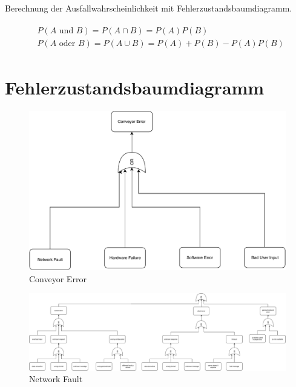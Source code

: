 \documentclass{beamer}
\begin{document}
\begin{frame}
	Berechnung der Ausfallwahrscheinlichkeit mit Fehlerzustandsbaumdiagramm. 
	
	\begin{align}\label{key}
	\begin{split}
	&P(A \text{ und } B) = P(A\cap B) = P(A)P(B)\\
	&P(A \text{ oder } B) = P(A\cup B) = P(A)+P(B)-P(A)P(B)
	\end{split}
	\end{align}
\end{frame}

\section{Fehlerzustandsbaumdiagramm}
\frame{\tableofcontents[currentsection]}
\begin{frame}
	\begin{figure}[H]
		\centering
		\includegraphics[width=0.7\linewidth]{../faultTreeAnalysis/FaultTreeAnalysisConveyer}
		\caption{Conveyor Error}
		\label{fig:faulttreeanalysisconveyer}
	\end{figure}
\end{frame}

\begin{frame}
	\begin{figure}[H]
		\centering
		\includegraphics[width=1.05\linewidth]{../faultTreeAnalysis/FaultTreeAnalysisNetwork}
		\caption{Network Fault}
		\label{fig:faulttreeanalysisnetwork}
	\end{figure}
\end{frame}
\end{document}
